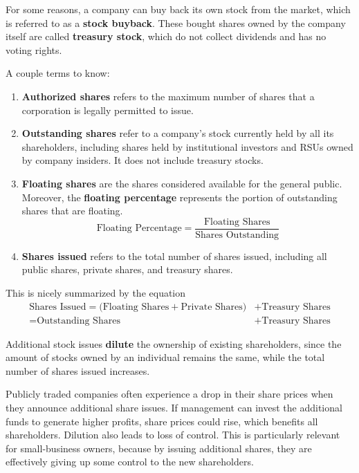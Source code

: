 \documentclass{article}
\begin{document}
    \begin{definition}
      For some reasons, a company can buy back its own stock from the market, which is referred to as a \textbf{stock buyback}. These bought shares owned by the company itself are called \textbf{treasury stock}, which do not collect dividends and has no voting rights. 
    \end{definition}

    \begin{definition}
       A couple terms to know: 
      \begin{enumerate}
        \item \textbf{Authorized shares} refers to the maximum number of shares that a corporation is legally permitted to issue. 
        \item \textbf{Outstanding shares} refer to a company's stock currently held by all its shareholders, including shares held by institutional investors and RSUs owned by company insiders. It does not include treasury stocks. 
        \item \textbf{Floating shares} are the shares considered available for the general public. Moreover, the \textbf{floating percentage} represents the portion of outstanding shares that are floating. 
        \[\text{Floating Percentage} = \frac{\text{Floating Shares}}{\text{Shares Outstanding}}\]
        \item \textbf{Shares issued} refers to the total number of shares issued, including all public shares, private shares, and treasury shares.
      \end{enumerate}
      This is nicely summarized by the equation 
      \begin{align*}
        \text{Shares Issued} = \big( \text{Floating Shares} + \text{Private Shares}\big) & + \text{Treasury Shares} \\
        = \text{Outstanding Shares} & + \text{Treasury Shares} 
      \end{align*}
    \end{definition}

    \begin{definition}[Dilution]
      Additional stock issues \textbf{dilute} the ownership of existing shareholders, since the amount of stocks owned by an individual remains the same, while the total number of shares issued increases. 

      Publicly traded companies often experience a drop in their share prices when they announce additional share issues. If management can invest the additional funds to generate higher profits, share prices could rise, which benefits all shareholders. Dilution also leads to loss of control. This is particularly relevant for small-business owners, because by issuing additional shares, they are effectively giving up some control to the new shareholders. 
    \end{definition}
\end{document}
